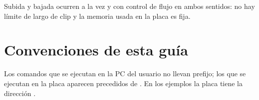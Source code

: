 Subida y bajada ocurren a la vez y con control de flujo en ambos sentidos: no
hay límite de largo de clip y la memoria usada en la placa es fija.

\section{Convenciones de esta guía}

Los comandos que se ejecutan en la PC del usuario no llevan prefijo; los que
se ejecutan en la placa aparecen precedidos de . En los
ejemplos la placa tiene la dirección .
